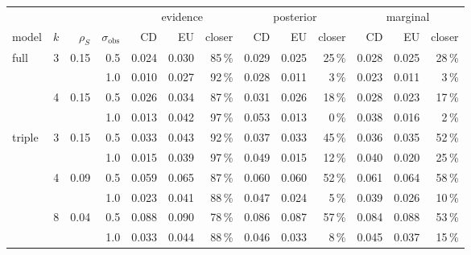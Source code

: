 \footnotesize\setlength{\tabcolsep}{4pt}
\begin{tabular}{lrrrrrrrrrrrr}
\toprule
& & & & \multicolumn{3}{c}{evidence} & \multicolumn{3}{c}{posterior} & \multicolumn{3}{c}{marginal} \\ \cmidrule(lr){5-7}\cmidrule(lr){8-10}\cmidrule(l){11-13}
model & $k$ & $\rho_S$ & $\sigma_{\mathrm{obs}}$ & CD & EU & closer & CD & EU & closer & CD & EU & closer \\
\midrule
full & 3 & 0.15 & 0.5 & 0.024 & 0.030 & 85\,\% & 0.029 & 0.025 & 25\,\% & 0.028 & 0.025 & 28\,\% \\
 &  &  & 1.0 & 0.010 & 0.027 & 92\,\% & 0.028 & 0.011 & 3\,\% & 0.023 & 0.011 & 3\,\% \\
 & 4 & 0.15 & 0.5 & 0.026 & 0.034 & 87\,\% & 0.031 & 0.026 & 18\,\% & 0.028 & 0.023 & 17\,\% \\
 &  &  & 1.0 & 0.013 & 0.042 & 97\,\% & 0.053 & 0.013 & 0\,\% & 0.038 & 0.016 & 2\,\% \\
triple & 3 & 0.15 & 0.5 & 0.033 & 0.043 & 92\,\% & 0.037 & 0.033 & 45\,\% & 0.036 & 0.035 & 52\,\% \\
 &  &  & 1.0 & 0.015 & 0.039 & 97\,\% & 0.049 & 0.015 & 12\,\% & 0.040 & 0.020 & 25\,\% \\
 & 4 & 0.09 & 0.5 & 0.059 & 0.065 & 87\,\% & 0.060 & 0.060 & 52\,\% & 0.061 & 0.064 & 58\,\% \\
 &  &  & 1.0 & 0.023 & 0.041 & 88\,\% & 0.047 & 0.024 & 5\,\% & 0.039 & 0.026 & 10\,\% \\
 & 8 & 0.04 & 0.5 & 0.088 & 0.090 & 78\,\% & 0.086 & 0.087 & 57\,\% & 0.084 & 0.088 & 53\,\% \\
 &  &  & 1.0 & 0.033 & 0.044 & 88\,\% & 0.046 & 0.033 & 8\,\% & 0.045 & 0.037 & 15\,\% \\
\bottomrule
\end{tabular}
